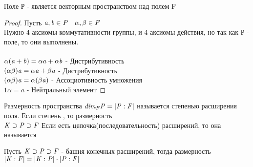 \begin{defin}
  Поле Р - является векторным пространством над полем F
\end{defin}

\begin{proof}
  Пусть $\mathit{a,b \in P \quad \alpha,\beta\in F}$ \\
  Нужно 4 аксиомы коммутативности группы, и 4 аксиомы действия, но так как Р -
  поле, то они выполнены. \\
   \\
  $\mathit{\alpha(a+b)=\alpha a + \alpha b}$ - Дистрибутивность \\
  $\mathit{(\alpha \beta)a=\alpha a + \beta a}$ - Дистрибутивность \\
  $\mathit{(\alpha \beta)a=\alpha(\beta a)}$ - Ассоциотивность умножения \\
  $1\alpha=a$ - Нейтральный элемент
\end{proof}

\begin{defin}
  Размерность пространства $\mathit{dim_{F}P = |P:F|}$ называется степенью
  расширения поля. Если степень , то размерность
   \\
  $\mathit {K \supset P \supset F}$ Если есть цепочка(последовательность)
  расширений, то она называется 
\end{defin}

\begin{theorem}
  Пусть $\mathit {K \supset P \supset F}$ - башня конечных расширений, тогда
  размерность $\mathit {|K:F|=|K:P|\cdot |P:F|}$
\end{theorem}


